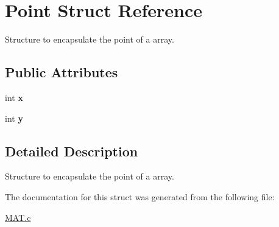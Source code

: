 \hypertarget{structPoint}{}\section{Point Struct Reference}
\label{structPoint}


Structure to encapsulate the point of a array.  


\subsection*{Public Attributes}
\begin{DoxyCompactItemize}
\item 
\mbox{\label{structPoint_a8c779e11e694b20e0946105a9f5de842}} 
int {\bfseries x}
\item 
\mbox{\label{structPoint_a2e1b5fb2b2a83571f5c0bc0f66a73cf7}} 
int {\bfseries y}
\end{DoxyCompactItemize}


\subsection{Detailed Description}
Structure to encapsulate the point of a array. 

The documentation for this struct was generated from the following file\+:\begin{DoxyCompactItemize}
\item 
\hyperlink{MAT_8c}{M\+A\+T.\+c}\end{DoxyCompactItemize}
